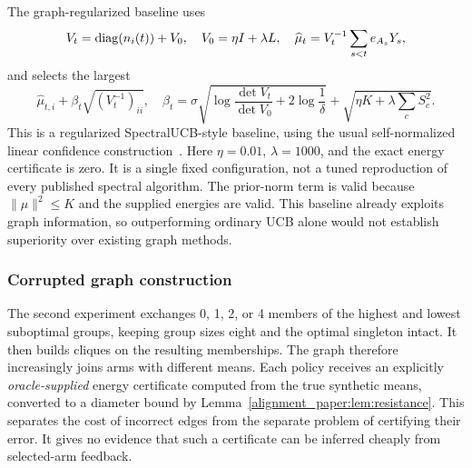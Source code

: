 The graph-regularized baseline uses
\begin{equation}
 V_t=\operatorname{diag}(n_i(t))+V_0,\quad V_0=\eta I+\lambda L,\quad
 \widehat\mu_t=V_t^{-1}\sum_{s<t}e_{A_s}Y_s,
\end{equation}
and selects the largest
\begin{equation}
 \widehat\mu_{t,i}+\beta_t\sqrt{(V_t^{-1})_{ii}},\quad
 \beta_t=\sigma\sqrt{\log\frac{\det V_t}{\det V_0}+2\log\frac1\delta}
       +\sqrt{\eta K+\lambda\sum_cS_c^2}.
\end{equation}
This is a regularized SpectralUCB-style baseline, using the usual self-normalized linear confidence construction~\cite{collected17,collected23}. Here $\eta=0.01$, $\lambda=1000$, and the exact energy certificate is zero. It is a single fixed configuration, not a tuned reproduction of every published spectral algorithm. The prior-norm term is valid because $\|\mu\|^2\le K$ and the supplied energies are valid. This baseline already exploits graph information, so outperforming ordinary UCB alone would not establish superiority over existing graph methods.

\subsubsection{Corrupted graph construction}
The second experiment exchanges 0, 1, 2, or 4 members of the highest and lowest suboptimal groups, keeping group sizes eight and the optimal singleton intact. It then builds cliques on the resulting memberships. The graph therefore increasingly joins arms with different means. Each policy receives an explicitly \emph{oracle-supplied} energy certificate computed from the true synthetic means, converted to a diameter bound by Lemma~\ref{alignment_paper:lem:resistance}. This separates the cost of incorrect edges from the separate problem of certifying their error. It gives no evidence that such a certificate can be inferred cheaply from selected-arm feedback.

